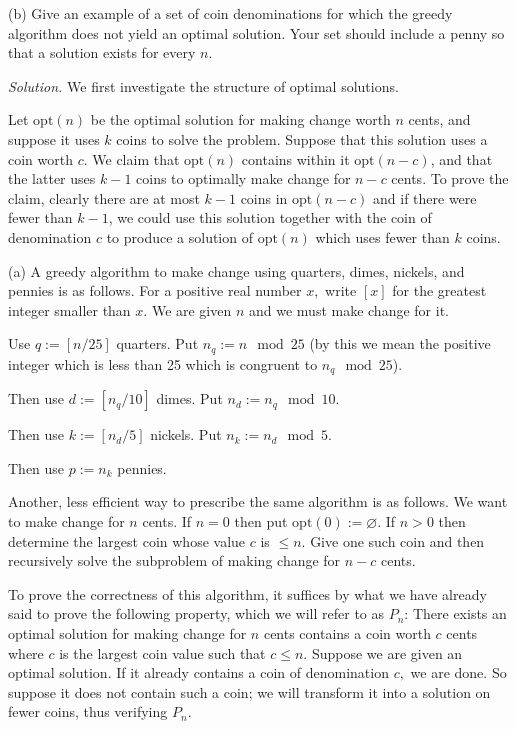 \documentclass[10pt,reqno]{amsart}
\begin{document}
\begin{outline}[enumerate]
(b) Give an example of a set of coin denominations for which the greedy
algorithm does not yield an optimal solution. Your set should include a penny
so that a solution exists for every $n$.

\newcommand{\opt}[1]{\ensuremath{\mathrm{opt}(#1)}}

\medskip
\noindent \emph{Solution.} We first investigate the structure of optimal
solutions.

Let \opt{n} be the optimal solution for making change worth $n$ cents, and
suppose it uses $k$ coins to solve the problem. Suppose that this solution uses
a coin worth $c$. We claim that \opt{n} contains within it \opt{n-c}, and that
the latter uses $k-1$ coins to optimally make change for $n-c$ cents. To prove
the claim, clearly there are at most $k-1$ coins in \opt{n-c} and if there were
fewer than $k-1$, we could use this solution together with the coin of
denomination $c$ to produce a solution of \opt{n} which uses fewer than $k$
coins.

(a) A greedy algorithm to make change using quarters, dimes, nickels, and
pennies is as follows. For a positive real number $x,$ write $[x]$ for the
greatest integer smaller than $x$. We are given $n$ and we must make change for
it.

Use $q := [n/25]$ quarters. Put $n_q := n \mod 25$ (by this we mean the
positive integer which is less than 25 which is congruent to $n_q \mod 25$).

Then use $d := [n_q/10]$ dimes. Put $n_d := n_q \mod 10$.

Then use $k := [n_d/5]$ nickels. Put $n_k := n_d \mod 5$.

Then use $p := n_k$ pennies.

Another, less efficient way to prescribe the same algorithm is as follows. We
want to make change for $n$ cents. If $n=0$ then put $\opt{0} := \varnothing$.
If $n > 0$ then determine the largest coin whose value $c$ is $\le n.$ Give one
such coin and then recursively solve the subproblem of making change for $n-c$
cents.

To prove the correctness of this algorithm, it suffices by what we have already
said to prove the following property, which we will refer to as $P_n$: There
exists an optimal solution for making change for $n$ cents contains a coin
worth $c$ cents where $c$ is the largest coin value such that $c \le n.$
Suppose we are given an optimal solution. If it already contains a coin of
denomination $c,$ we are done. So suppose it does not contain such a coin; we
will transform it into a solution on fewer coins, thus verifying $P_n.$


\end{outline}
\end{document}
